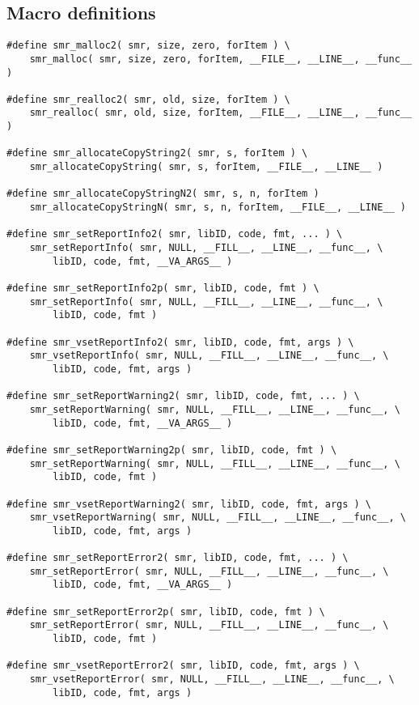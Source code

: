 \documentclass[11pt]{article}
\begin{document}
\subsection{Macro definitions} \label{MACROS}
\begin{verbatim}
#define smr_malloc2( smr, size, zero, forItem ) \
    smr_malloc( smr, size, zero, forItem, __FILE__, __LINE__, __func__ )

#define smr_realloc2( smr, old, size, forItem ) \
    smr_realloc( smr, old, size, forItem, __FILE__, __LINE__, __func__ )

#define smr_allocateCopyString2( smr, s, forItem ) \
    smr_allocateCopyString( smr, s, forItem, __FILE__, __LINE__ )

#define smr_allocateCopyStringN2( smr, s, n, forItem ) 
    smr_allocateCopyStringN( smr, s, n, forItem, __FILE__, __LINE__ )

#define smr_setReportInfo2( smr, libID, code, fmt, ... ) \
    smr_setReportInfo( smr, NULL, __FILL__, __LINE__, __func__, \
        libID, code, fmt, __VA_ARGS__ )

#define smr_setReportInfo2p( smr, libID, code, fmt ) \
    smr_setReportInfo( smr, NULL, __FILL__, __LINE__, __func__, \
        libID, code, fmt )

#define smr_vsetReportInfo2( smr, libID, code, fmt, args ) \
    smr_vsetReportInfo( smr, NULL, __FILL__, __LINE__, __func__, \
        libID, code, fmt, args )

#define smr_setReportWarning2( smr, libID, code, fmt, ... ) \
    smr_setReportWarning( smr, NULL, __FILL__, __LINE__, __func__, \
        libID, code, fmt, __VA_ARGS__ )

#define smr_setReportWarning2p( smr, libID, code, fmt ) \
    smr_setReportWarning( smr, NULL, __FILL__, __LINE__, __func__, \
        libID, code, fmt )

#define smr_vsetReportWarning2( smr, libID, code, fmt, args ) \
    smr_vsetReportWarning( smr, NULL, __FILL__, __LINE__, __func__, \
        libID, code, fmt, args )

#define smr_setReportError2( smr, libID, code, fmt, ... ) \
    smr_setReportError( smr, NULL, __FILL__, __LINE__, __func__, \
        libID, code, fmt, __VA_ARGS__ )

#define smr_setReportError2p( smr, libID, code, fmt ) \
    smr_setReportError( smr, NULL, __FILL__, __LINE__, __func__, \
        libID, code, fmt )

#define smr_vsetReportError2( smr, libID, code, fmt, args ) \
    smr_vsetReportError( smr, NULL, __FILL__, __LINE__, __func__, \
        libID, code, fmt, args )


\end{verbatim}
\end{document}
